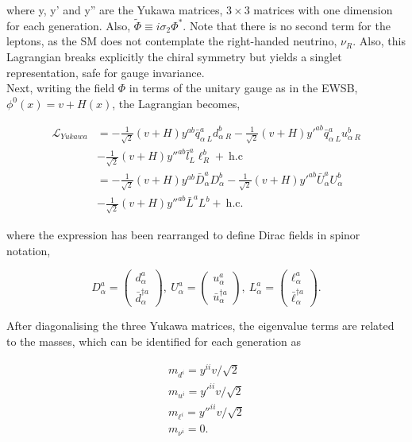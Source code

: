 where y, y' and y'' are the Yukawa matrices, $3\times3$ matrices with one dimension for each generation. Also, $\tilde{\Phi}\equiv i\sigma_2\Phi^*$. Note that there is no second term for the leptons, as the SM does not contemplate the right-handed neutrino, $\nu_R$. Also, this Lagrangian breaks explicitly the chiral symmetry but yields a singlet representation, safe for gauge invariance.\\

Next, writing the field $\Phi$ in terms of the unitary gauge as in the EWSB, $\phi^0(x)=v+H(x)$, the Lagrangian becomes,

\begin{equation}
\begin{split}
    \mathcal{L}_{Yukawa} &= -\frac{1}{\sqrt{2}}(v+H)y^{ab}\bar{q}^a_{\alpha\ L} d^b_{\alpha\ R} - \frac{1}{\sqrt{2}}(v+H)y'^{ab}\bar{q}^a_{\alpha\ L}u^b_{\alpha\ R}\\
    &-\frac{1}{\sqrt{2}}(v+H)y''^{ab}\bar{l}^a_{L}\ell^b_{R}+\ \text{h.c}\\
    &=-\frac{1}{\sqrt{2}}(v+H)y^{ab} \bar{D}^a_\alpha D^b_\alpha - \frac{1}{\sqrt{2}}(v+H)y'^{ab}\bar{U}^a_\alpha U^b_\alpha\\
    &-\frac{1}{\sqrt{2}}(v+H)y''^{ab}\bar{L}^a L^b+\ \text{h.c}.
\end{split}
\end{equation}

where the expression has been rearranged to define Dirac fields in spinor notation,

\begin{equation}
\label{Theory_eq:Diracmassspace}
    D_\alpha^a = \begin{pmatrix} d_\alpha^a \\ \bar{d}^{\dag a}_\alpha \end{pmatrix},\ 
    U_\alpha^a = \begin{pmatrix} u_\alpha^a \\ \bar{u}^{\dag a}_\alpha \end{pmatrix},\ 
    L_\alpha^a = \begin{pmatrix} \ell_\alpha^a \\ \bar{\ell}^{\dag a}_\alpha \end{pmatrix}.
\end{equation}

After diagonalising the three Yukawa matrices, the eigenvalue terms are related to the masses, which can be identified for each generation as

\begin{equation}
\begin{split}
m_{d^i} = y^{ii}v/\sqrt{2} \\ 
m_{u^i} = y'^{ii}v/\sqrt{2} \\
m_{\ell^i} = y''^{ii}v/\sqrt{2} \\
m_{\nu^i} = 0.
\end{split}
\label{Theory_eq:yukawacouplings}
\end{equation}

